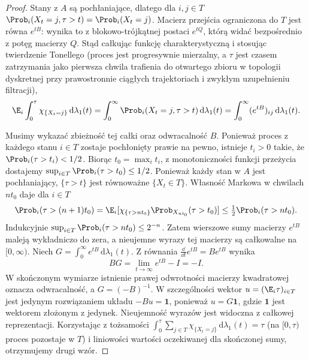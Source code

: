 \begin{proof}
Stany z $A$ są pochłaniające, dlatego dla $i,j\in T$
$\Prob_i(X_t=j,\tau>t)=\Prob_i(X_t=j)$.
Macierz przejścia ograniczona do $T$ jest równa $e^{tB}$:
wynika to z blokowo-trójkątnej postaci $e^{tQ}$,
którą widać bezpośrednio z potęg macierzy $Q$.
Stąd całkując funkcję charakterystyczną i stosując
twierdzenie Tonellego (proces jest progresywnie mierzalny,
a $\tau$ jest czasem zatrzymania jako pierwsza chwila
trafienia do otwartego zbioru w topologii dyskretnej
przy prawostronnie ciągłych trajektoriach i zwykłym
uzupełnieniu filtracji),
\[
\E_i\int_0^\tau\chi_{\{X_t=j\}}\,\mathrm d\lambda_1(t)
=\int_0^\infty\Prob_i(X_t=j,\tau>t)\,\mathrm d\lambda_1(t)
=\int_0^\infty(e^{tB})_{ij}\,\mathrm d\lambda_1(t).
\]

Musimy wykazać zbieżność tej całki oraz odwracalność $B$.
Ponieważ proces z każdego stanu $i\in T$ zostaje pochłonięty
prawie na pewno, istnieje $t_i>0$ takie, że
$\Prob_i(\tau>t_i)<1/2$. Biorąc $t_0=\max_i t_i$,
z monotoniczności funkcji przeżycia dostajemy
$\sup_{i\in T}\Prob_i(\tau>t_0)\le1/2$.
Ponieważ każdy stan w $A$ jest pochłaniający, $\{\tau>t\}$
jest równoważne $\{X_t\in T\}$. Własność Markowa
w chwilach $nt_0$ daje dla $i\in T$
\[
\Prob_i(\tau>(n+1)t_0)
=\E_i[\chi_{\{\tau>nt_0\}}\Prob_{X_{nt_0}}(\tau>t_0)]
\le\tfrac12\Prob_i(\tau>nt_0).
\]
Indukcyjnie $\sup_{i\in T}\Prob_i(\tau>nt_0)\le2^{-n}$.
Zatem wierszowe sumy macierzy $e^{tB}$ maleją
wykładniczo do zera, a nieujemne wyrazy tej macierzy
są całkowalne na $[0,\infty)$. Niech
$G=\int_0^\infty e^{tB}\,\mathrm d\lambda_1(t)$.
Z równania $\frac{\dd}{\dd t}e^{tB}=Be^{tB}$ wynika
\[
BG=\lim_{t\to\infty}e^{tB}-I=-I.
\]
W skończonym wymiarze istnienie prawej odwrotności
macierzy kwadratowej oznacza odwracalność, a
$G=(-B)^{-1}$. W szczególności wektor $u=(\E_i\tau)_{i\in T}$
jest jedynym rozwiązaniem układu $-Bu=\mathbf 1$,
ponieważ $u=G\mathbf 1$, gdzie $\mathbf 1$ jest wektorem
złożonym z jedynek. Nieujemność wyrazów jest widoczna
z całkowej reprezentacji. Korzystając z tożsamości
$\int_0^\tau\sum_{j\in T}\chi_{\{X_t=j\}}\,\mathrm d\lambda_1(t)=\tau$
(na $[0,\tau)$ proces pozostaje w $T$)
i liniowości wartości oczekiwanej dla skończonej sumy,
otrzymujemy drugi wzór.
\end{proof}

